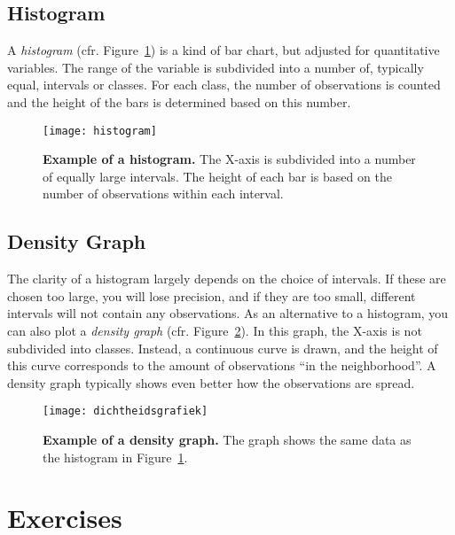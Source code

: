 \subsection{Histogram}

A \emph{histogram} (cfr. Figure~\ref{fig:histogram}) is a kind of bar chart, but adjusted for quantitative variables.
The range of the variable is subdivided into a number of, typically equal, intervals or classes. For each class, the number of observations is counted and the height of the bars is determined based on this number.

\begin{figure}
    \centering
    \texttt{[image: histogram]}
    \caption[Example of a histogram]{\textbf{Example of a histogram.} The X-axis is subdivided into a number of equally large intervals. The height of each bar is based on the number of observations within each interval.}
    \label{fig:histogram}
\end{figure}

\subsection{Density Graph}

The clarity of a histogram largely depends on the choice of intervals. If these are chosen too large, you will lose precision, and if they are too small, different intervals will not contain any observations. As an alternative to a histogram, you can also plot a \emph{density graph} (cfr. Figure~\ref{fig:dichtheidsgrafiek}). In this graph, the X-axis is not subdivided into classes. Instead, a continuous curve is drawn, and the height of this curve corresponds to the amount of observations ``in the neighborhood''. A density graph typically shows even better how the observations are spread.

\begin{figure}
    \centering
    \texttt{[image: dichtheidsgrafiek]}
    \caption[Example of a density graph]{\textbf{Example of a density graph.} The graph shows the same data as the histogram in Figure~\ref{fig:histogram}.}
    \label{fig:dichtheidsgrafiek}
\end{figure}

\section{Exercises}
\label{sec:exercises-univariate-analysis}

